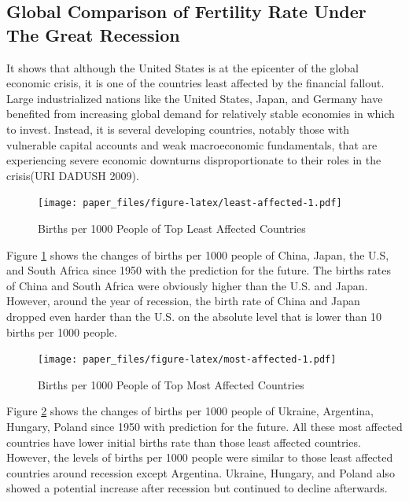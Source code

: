 \documentclass[
]{article}
\begin{document}
\hypertarget{global-comparison-of-fertility-rate-under-the-great-recession}{%
\subsection{Global Comparison of Fertility Rate Under The Great Recession}\label{global-comparison-of-fertility-rate-under-the-great-recession}}

It shows that although the United States is at the epicenter of the global economic crisis, it is one of the countries least affected by the financial fallout. Large industrialized nations like the United States, Japan, and Germany have benefited from increasing global demand for relatively stable economies in which to invest. Instead, it is several developing countries, notably those with vulnerable capital accounts and weak macroeconomic fundamentals, that are experiencing severe economic downturns disproportionate to their roles in the crisis(URI DADUSH 2009).

\begin{figure}
\centering
\texttt{[image: paper\_files/figure-latex/least-affected-1.pdf]}
\caption{\label{fig:least-affected}Births per 1000 People of Top Least Affected Countries}
\end{figure}

Figure \ref{fig:least-affected} shows the changes of births per 1000 people of China, Japan, the U.S, and South Africa since 1950 with the prediction for the future. The births rates of China and South Africa were obviously higher than the U.S. and Japan. However, around the year of recession, the birth rate of China and Japan dropped even harder than the U.S. on the absolute level that is lower than 10 births per 1000 people.

\begin{figure}
\centering
\texttt{[image: paper\_files/figure-latex/most-affected-1.pdf]}
\caption{\label{fig:most-affected}Births per 1000 People of Top Most Affected Countries}
\end{figure}

Figure \ref{fig:most-affected} shows the changes of births per 1000 people of Ukraine, Argentina, Hungary, Poland since 1950 with prediction for the future. All these most affected countries have lower initial births rate than those least affected countries. However, the levels of births per 1000 people were similar to those least affected countries around recession except Argentina. Ukraine, Hungary, and Poland also showed a potential increase after recession but continued to decline afterwards.
\end{document}
